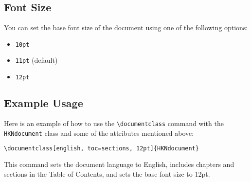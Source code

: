 \subsection{Font Size}

You can set the base font size of the document using one of the following options:
\begin{itemize}
  \item \texttt{10pt}
  \item \texttt{11pt} (default)
  \item \texttt{12pt}
\end{itemize}

\subsection{Example Usage}

Here is an example of how to use the \texttt{\textbackslash documentclass} command with the \texttt{HKNdocument} class and some of the attributes mentioned above:
\begin{verbatim}
\documentclass[english, toc=sections, 12pt]{HKNdocument}
\end{verbatim}

This command sets the document language to English, includes chapters and sections in the Table of Contents, and sets the base font size to 12pt.
